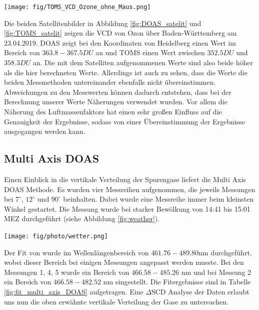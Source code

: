 \documentclass[12pt, a4paper, bibliography=totoc]{scrartcl}
\begin{document}
\begin{multicols}{2}
\begin{center}
	\texttt{[image: fig/TOMS\_VCD\_Ozone\_ohne\_Maus.png]}
	\label{fig:TOMS_satelit}
\end{center} 
Die beiden Satellitenbilder in Abbildung \ref{fig:DOAS_satelit} und \ref{fig:TOMS_satelit} zeigen die VCD von Ozon über Baden-Württemberg am 23.04.2019.
DOAS zeigt bei den Koordinaten von Heidelberg einen Wert im Bereich von $363.8 - 367.5 \si{DU}$ an und TOMS einen Wert zwischen $352.5 \si{DU}$ und $358.3 \si{DU}$ an.
Die mit dem Satelliten aufgenommenen Werte sind also beide höher als die hier berechneten Werte.
Allerdings ist auch zu sehen, dass die Werte die beiden Messmethoden untereinander ebenfalls nicht übereinstimmen.
Abweichungen zu den Messwerten können dadurch entstehen, dass bei der Berechnung unserer Werte Näherungen verwendet wurden.
Vor allem die Näherung des Luftmassenfaktors hat einen sehr großen Einfluss auf die Genauigkeit der Ergebnisse, sodass von einer Übereinstimmung der Ergebnisse ausgegangen werden kann.

\subsection{Multi Axis DOAS}\label{ssec:multi_axis_DOAS}

Einen Einblick in die vertikale Verteilung der Spurengase liefert die Multi Axis DOAS Methode.
Es wurden vier Messreihen aufgenommen, die jeweils Messungen bei $7^\circ$, $12^\circ$ und $90^\circ$ beinhalten. 
Dabei wurde eine Messreihe immer beim kleinsten Winkel gestartet.
Die Messung wurde bei starker Bewölkung von 14:41 bis 15:01 MEZ durchgeführt (siehe Abbildung \ref{fig:weather}).

\begin{center}
	\texttt{[image: fig/photo/wetter.png]}
	\label{fig:weather}
\end{center} 

Der Fit von  wurde im Wellenlängenbereich von $461.76 - 489.80$\si{nm} durchgeführt, wobei dieser Bereich bei einigen Messungen angepasst werden musste. 
Bei den Messungen 1, 4, 5 wurde ein Bereich von $466.58 - 485.26$ \si{nm} und bei Messung 2 ein Bereich von $466.58 - 482.52$ \si{nm} eingestellt.
Die Fitergebnisse sind in Tabelle \ref{fig:fit_multi_axis_DOAS} aufgetragen.
Eine $\Delta \text{SCD}$ Analyse der Daten erlaubt uns nun die oben erwähnte vertikale Verteilung der Gase zu untersuchen.


\end{multicols}
\end{document}
